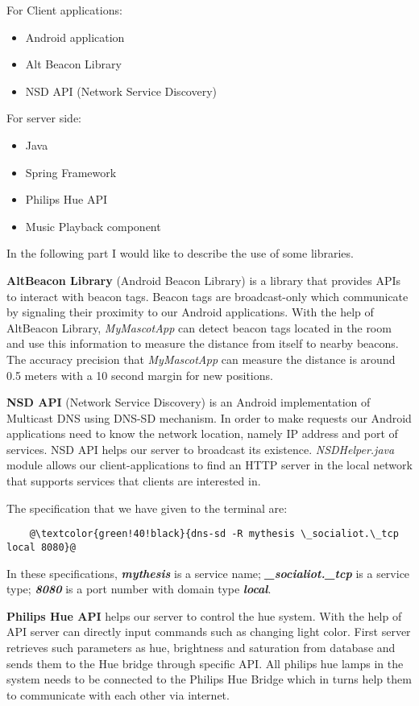 For Client applications:
\begin{itemize}
    \item Android application
    \item Alt Beacon Library
    \item NSD API (Network Service Discovery)
\end{itemize}

For server side:
\begin{itemize}
    \item Java
    \item Spring Framework
    \item Philips Hue API
    \item Music Playback component
\end{itemize}

In the following part I would like to describe the use of some libraries.

\textbf{AltBeacon Library} (Android Beacon Library) is a library that provides APIs to interact with beacon tags.
Beacon tags are broadcast-only which communicate by signaling their proximity to our Android applications.
With the help of AltBeacon Library, \emph{MyMascotApp} can detect beacon tags located in the room
and use this information to measure the distance from itself to nearby beacons.
The accuracy precision that \emph{MyMascotApp} can measure the distance is around 0.5 meters
with a 10 second margin for new positions.

\textbf{NSD API} (Network Service Discovery) is an Android implementation of Multicast DNS using DNS-SD mechanism.
In order to make requests our Android applications need to know the network location,
namely IP address and port of services.
NSD API helps our server to broadcast its existence.
\emph{NSDHelper.java} module allows our client-applications to find an HTTP server in the local network that supports
services that clients are interested in.

The specification that we have given to the terminal are:
\begin{lstlisting}
    @\textcolor{green!40!black}{dns-sd -R mythesis \_socialiot.\_tcp local 8080}@
\end{lstlisting}
In these specifications, \textbf{\emph{mythesis}} is a service name;
\textbf{\emph{\_socialiot.\_tcp}} is a service type;
\textbf{\emph{8080}} is a port number with domain type \textbf{\emph{local}}.

\textbf{Philips Hue API} helps our server to control the hue system.
With the help of API server can directly input commands such as changing light color.
First server retrieves such parameters as hue, brightness and saturation from database and sends them
to the Hue bridge through specific API\@.
All philips hue lamps in the system needs to be connected to the Philips Hue Bridge which in turns help them
to communicate with each other via internet.

